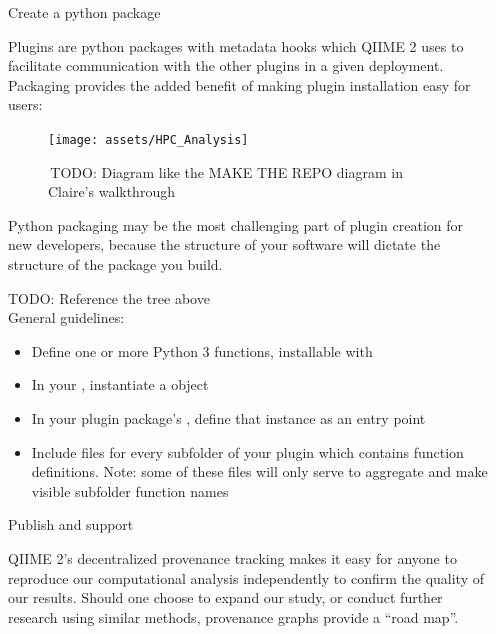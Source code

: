 \documentclass[final]{beamer}
\newlength{\sepwidth}
\newlength{\colwidth}
\newcommand{\separatorcolumn}{\begin{column}{\sepwidth}\end{column}}
\begin{document}
\begin{frame}[t]
\begin{columns}[t]
\separatorcolumn

\begin{column}{\colwidth}

  \begin{block}{Create a python package}

    Plugins are python packages with metadata hooks which QIIME 2 uses to facilitate
    communication with the other plugins in a given deployment. Packaging
    provides the added benefit of making plugin installation easy for users:

    \begin{figure}[tph!]
      {\texttt{[image: assets/HPC\_Analysis]}}
      \caption{\,TODO: Diagram like the MAKE THE REPO diagram in Claire's walkthrough}
      \label{fig:dada2}
    \end{figure}

    \begin{tcolorbox}
    [width=\textwidth, colframe=blue]
    {Python packaging may be the most challenging part of plugin creation
    for new developers, because the structure of your software will dictate
    the structure of the package you build. }
    \end{tcolorbox}
    TODO: Reference the tree above\\
    General guidelines:
    \begin{itemize}
      \item Define one or more Python 3 functions, installable with 
      \item In your , instantiate a  object
      \item In your plugin package's , define that instance as an entry point
      \item Include  files for every subfolder of your plugin which contains function definitions. Note: some of these 
      files will only serve to aggregate and make visible subfolder function names
    \end{itemize}
  \end{block}

  \begin{block}{Publish and support}

    QIIME 2’s decentralized provenance tracking makes it easy for anyone to reproduce our
    computational analysis independently to confirm the quality of our results.
    Should one choose to expand our study, or conduct further research using
    similar methods, provenance graphs provide a “road map”.


\end{block}
\end{column}
\end{columns}
\end{frame}
\end{document}
